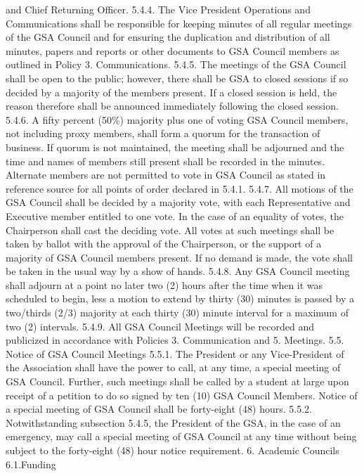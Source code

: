 \documentclass{article}
\begin{document}
and Chief Returning Officer. 
5.4.4. The Vice President Operations and Communications shall be 
responsible for keeping minutes of all regular meetings of the GSA 
Council and for ensuring the duplication and distribution of all 
minutes, papers and reports or other documents to GSA Council 
members as outlined in Policy 3. Communications. 
5.4.5. The meetings of the GSA Council shall be open to the public; 
however, there shall be GSA to closed sessions if so decided by a 
majority of the members present. If a closed session is held, the reason 
therefore shall be announced immediately following the closed 
session. 
5.4.6. A fifty percent (50\%) majority plus one of voting GSA Council 
members, not including proxy members, shall form a quorum for the 
transaction of business. If quorum is not maintained, the meeting shall 
be adjourned and the time and names of members still present shall be 
recorded in the minutes. Alternate members are not permitted to vote 
in GSA Council as stated in reference source for all points of order 
declared in 5.4.1. 
5.4.7. All motions of the GSA Council shall be decided by a majority vote, 
with each Representative and Executive member entitled to one vote. 
In the case of an equality of votes, the Chairperson shall cast the 
deciding vote. All votes at such meetings shall be taken by ballot with 
the approval of the Chairperson, or the support of a majority of GSA 
Council members present. If no demand is made, the vote shall be 
taken in the usual way by a show of hands. 
5.4.8. Any GSA Council meeting shall adjourn at a point no later two (2) 
hours after the time when it was scheduled to begin, less a motion to 
extend by thirty (30) minutes is passed by a two/thirds (2/3) majority 
at each thirty (30) minute interval for a maximum of two (2) intervals. 
5.4.9. All GSA Council Meetings will be recorded and publicized in accordance with Policies 3. Communication and 5. Meetings. 
5.5. Notice of GSA Council Meetings 
5.5.1. The President or any Vice-President of the Association shall have the 
power to call, at any time, a special meeting of GSA Council. Further, 
such meetings shall be called by a student at large upon receipt of a 
petition to do so signed by ten (10) GSA Council Members. Notice of 
a special meeting of GSA Council shall be forty-eight (48) hours. 
5.5.2. Notwithstanding subsection 5.4.5, the President of the GSA, in the 
case of an emergency, may call a special meeting of GSA Council at 
any time without being subject to the forty-eight (48) hour notice 
requirement. 
6. Academic Councils 
6.1.Funding 
\end{document}
